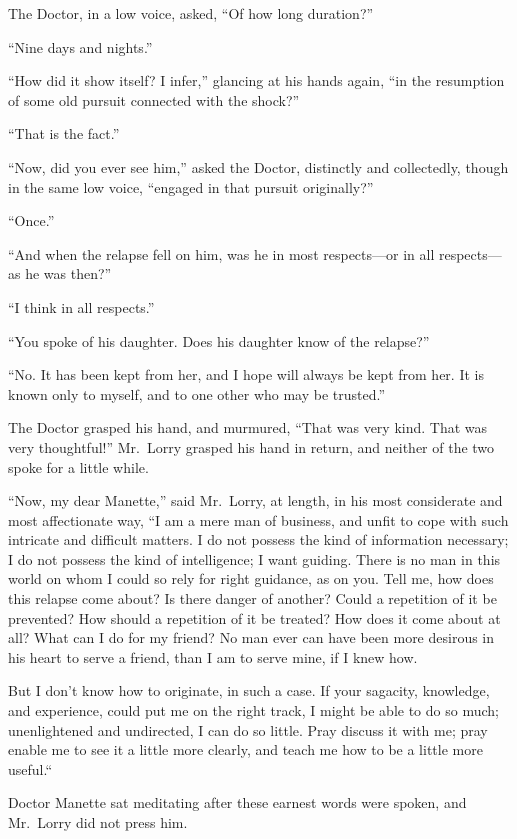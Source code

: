 The Doctor, in a low voice, asked, ``Of how long duration?''

``Nine days and nights.''

``How did it show itself?  I infer,'' glancing at his hands again,
``in the resumption of some old pursuit connected with the shock?''

``That is the fact.''

``Now, did you ever see him,'' asked the Doctor, distinctly and
collectedly, though in the same low voice, ``engaged in that
pursuit originally?''

``Once.''

``And when the relapse fell on him, was he in most respects---or in
all respects---as he was then?''

``I think in all respects.''

``You spoke of his daughter.  Does his daughter know of the relapse?''

``No.  It has been kept from her, and I hope will always be kept from
her.  It is known only to myself, and to one other who may be trusted.''

The Doctor grasped his hand, and murmured, ``That was very kind.
That was very thoughtful!''  Mr.\ Lorry grasped his hand in return,
and neither of the two spoke for a little while.

``Now, my dear Manette,'' said Mr.\ Lorry, at length, in his most
considerate and most affectionate way, ``I am a mere man of business,
and unfit to cope with such intricate and difficult matters.  I do
not possess the kind of information necessary; I do not possess the
kind of intelligence; I want guiding.  There is no man in this world
on whom I could so rely for right guidance, as on you.  Tell me, how
does this relapse come about?  Is there danger of another?  Could a
repetition of it be prevented?  How should a repetition of it be
treated?  How does it come about at all?  What can I do for my friend?
No man ever can have been more desirous in his heart to serve a friend,
than I am to serve mine, if I knew how.

But I don't know how to originate, in such a case.  If your sagacity,
knowledge, and experience, could put me on the right track, I might be
able to do so much; unenlightened and undirected, I can do so little.
Pray discuss it with me; pray enable me to see it a little more clearly,
and teach me how to be a little more useful.``

Doctor Manette sat meditating after these earnest words were spoken,
and Mr.\ Lorry did not press him.


